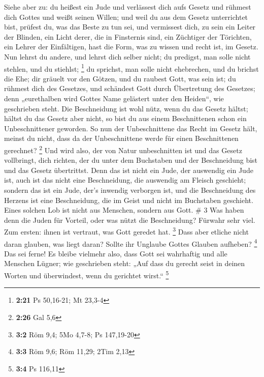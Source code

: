  Siehe aber zu: du heißest ein Jude und verlässest dich
aufs Gesetz und rühmest dich Gottes  und weißt seinen
Willen; und weil du aus dem Gesetz unterrichtet bist, prüfest du, was
das Beste zu tun sei,  und vermissest dich, zu sein ein
Leiter der Blinden, ein Licht derer, die in Finsternis sind,
 ein Züchtiger der Törichten, ein Lehrer der Einfältigen,
hast die Form, was zu wissen und recht ist, im Gesetz. 
Nun lehrst du andere, und lehrst dich selber nicht; du predigst, man
solle nicht stehlen, und du stiehlst; \footnote{\textbf{2:21} Ps
  50,16-21; Mt 23,3-4}  du sprichst, man solle nicht
ehebrechen, und du brichst die Ehe; dir gräuelt vor den Götzen, und du
raubest Gott, was sein ist;  du rühmest dich des
Gesetzes, und schändest Gott durch Übertretung des Gesetzes;
 denn „eurethalben wird Gottes Name gelästert unter den
Heiden``, wie geschrieben steht.  Die Beschneidung ist
wohl nütz, wenn du das Gesetz hältst; hältst du das Gesetz aber nicht,
so bist du aus einem Beschnittenen schon ein Unbeschnittener geworden.
 So nun der Unbeschnittene das Recht im Gesetz hält,
meinst du nicht, dass da der Unbeschnittene werde für einen
Beschnittenen gerechnet? \footnote{\textbf{2:26} Gal 5,6}
 Und wird also, der von Natur unbeschnitten ist und das
Gesetz vollbringt, dich richten, der du unter dem Buchstaben und der
Beschneidung bist und das Gesetz übertrittst.  Denn das
ist nicht ein Jude, der auswendig ein Jude ist, auch ist das nicht eine
Beschneidung, die auswendig am Fleisch geschieht; 
sondern das ist ein Jude, der's inwendig verborgen ist, und die
Beschneidung des Herzens ist eine Beschneidung, die im Geist und nicht
im Buchstaben geschieht. Eines solchen Lob ist nicht aus Menschen,
sondern aus Gott. \# 3  Was haben denn die Juden für
Vorteil, oder was nützt die Beschneidung?  Fürwahr sehr
viel. Zum ersten: ihnen ist vertraut, was Gott geredet hat. \footnote{\textbf{3:2}
  Röm 9,4; 5Mo 4,7-8; Ps 147,19-20}  Dass aber etliche
nicht daran glauben, was liegt daran? Sollte ihr Unglaube Gottes Glauben
aufheben? \footnote{\textbf{3:3} Röm 9,6; Röm 11,29; 2Tim 2,13}
 Das sei ferne! Es bleibe vielmehr also, dass Gott sei
wahrhaftig und alle Menschen Lügner; wie geschrieben steht: „Auf dass du
gerecht seist in deinen Worten und überwindest, wenn du gerichtet
wirst.`` \footnote{\textbf{3:4} Ps 116,11}

